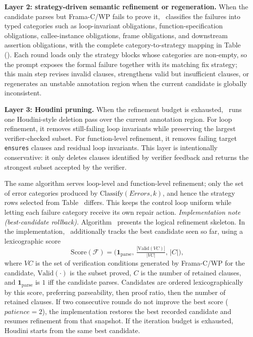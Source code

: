 \textbf{Layer 2: strategy-driven semantic refinement or regeneration.}
When the candidate parses but Frama-C/WP fails to prove it, \toolname\ classifies the failures into typed categories such as loop-invariant obligations, function-specification obligations, callee-instance obligations, frame obligations, and downstream assertion obligations, with the complete category-to-strategy mapping in Table~ (). Each round loads only the strategy blocks whose categories are non-empty, so the prompt exposes the formal failure together with its matching fix strategy; this main step revises invalid clauses, strengthens valid but insufficient clauses, or regenerates an unstable annotation region when the current candidate is globally inconsistent. 

\textbf{Layer 3: Houdini pruning.}
When the refinement budget is exhausted, \toolname\ runs one Houdini-style deletion pass over the current annotation region. For loop refinement, it removes still-failing loop invariants while preserving the largest verifier-checked subset. For function-level refinement, it removes failing target \texttt{ensures} clauses and residual loop invariants. This layer is intentionally conservative: it only deletes clauses identified by verifier feedback and returns the strongest subset accepted by the verifier.

The same algorithm serves loop-level and function-level refinement; only the set of error categories produced by $\mathrm{Classify}(\mathit{Errors},k)$, and hence the strategy rows selected from Table~ differs. This keeps the control loop uniform while letting each failure category receive its own repair action.
\noindent\textit{Implementation note (best-candidate rollback).}
Algorithm~ presents the logical refinement skeleton. In the implementation, \toolname\ additionally tracks the best candidate seen so far, using a lexicographic score
\[
\mathrm{Score}(\mathcal{F}) =
\big(\mathbf{1}_{\mathrm{parse}},\,
\tfrac{|\mathrm{Valid}(\mathit{VC})|}{|\mathit{VC}|},\,
|C|\big),
\]
where $\mathit{VC}$ is the set of verification conditions generated by Frama-C/WP for the candidate, $\mathrm{Valid}(\cdot)$ is the subset proved, $C$ is the number of retained clauses, and $\mathbf{1}_{\mathrm{parse}}$ is $1$ iff the candidate parses. Candidates are ordered lexicographically by this score, preferring parseability, then proof ratio, then the number of retained clauses. If two consecutive rounds do not improve the best score (\(\textit{patience}=2\)), the implementation restores the best recorded candidate and resumes refinement from that snapshot. If the iteration budget is exhausted, Houdini starts from the same best candidate.

